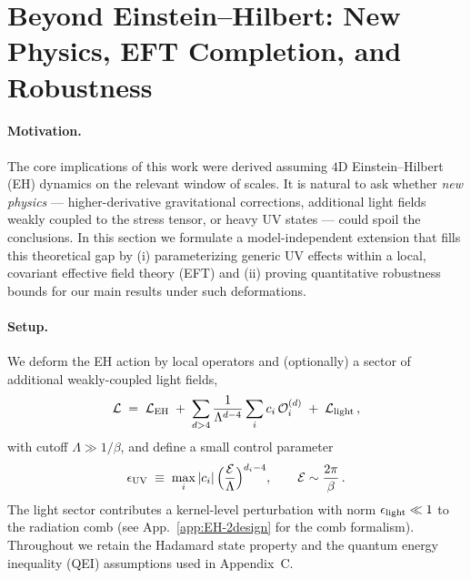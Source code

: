 \documentclass[a4paper,11pt]{article}
\theoremstyle{plain}
\theoremstyle{definition}
\theoremstyle{remark}
\begin{document}
\section{Beyond Einstein--Hilbert: New Physics, EFT Completion, and Robustness}\label{sec:new-physics}

\paragraph{Motivation.} The core implications of this work were derived assuming $4$D Einstein--Hilbert (EH) dynamics on the relevant window of scales. It is natural to ask whether \emph{new physics} --- higher-derivative gravitational corrections, additional light fields weakly coupled to the stress tensor, or heavy UV states --- could spoil the conclusions. In this section we formulate a model-independent extension that fills this theoretical gap by (i) parameterizing generic UV effects within a local, covariant effective field theory (EFT) and (ii) proving quantitative robustness bounds for our main results under such deformations.

\paragraph{Setup.} We deform the EH action by local operators and (optionally) a sector of additional weakly-coupled light fields,
\begin{equation}
\mathcal{L} \;=\; \mathcal{L}_{\rm EH} \;+\; \sum_{d>4} \frac{1}{\Lambda^{d-4}} \sum_i c_i\, \mathcal{O}^{(d)}_i \;+\; \mathcal{L}_{\rm light}\,,
\end{equation}
with cutoff $\Lambda \gg 1/\beta$, and define a small control parameter
\begin{equation}
\epsilon_{\rm UV} \;\equiv\; \max_i |c_i| \,\Big(\frac{\mathcal{E}}{\Lambda}\Big)^{d_i-4}, \qquad \mathcal{E}\sim \frac{2\pi}{\beta}\,.
\end{equation}
The light sector contributes a kernel-level perturbation with norm $\epsilon_{\rm light}\ll 1$ to the radiation comb (see App.~\ref{app:EH-2design} for the comb formalism). Throughout we retain the Hadamard state property and the quantum energy inequality (QEI) assumptions used in Appendix~C.
\end{document}
